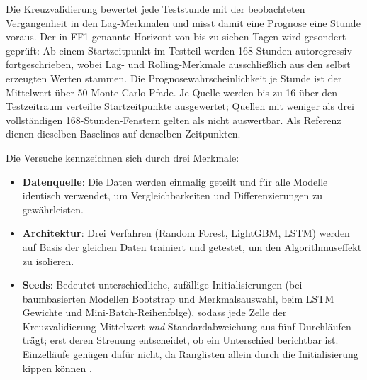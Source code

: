 Die Kreuzvalidierung bewertet jede Teststunde mit der beobachteten Vergangenheit in den Lag-Merkmalen und misst damit eine Prognose eine Stunde voraus. Der in FF1 genannte Horizont von bis zu sieben Tagen wird gesondert geprüft: Ab einem Startzeitpunkt im Testteil werden 168 Stunden autoregressiv fortgeschrieben, wobei Lag- und Rolling-Merkmale ausschließlich aus den selbst erzeugten Werten stammen. Die Prognosewahrscheinlichkeit je Stunde ist der Mittelwert über 50 Monte-Carlo-Pfade. Je Quelle werden bis zu 16 über den Testzeitraum verteilte Startzeitpunkte ausgewertet; Quellen mit weniger als drei vollständigen 168-Stunden-Fenstern gelten als nicht auswertbar. Als Referenz dienen dieselben Baselines auf denselben Zeitpunkten.

Die Versuche kennzeichnen sich durch drei Merkmale:
\begin{itemize}
  \item \textbf{Datenquelle}: Die Daten werden einmalig geteilt und für alle Modelle identisch verwendet, um Vergleichbarkeiten und Differenzierungen zu gewährleisten.
  \item \textbf{Architektur}: Drei Verfahren (Random Forest, LightGBM, LSTM) werden auf Basis der gleichen Daten trainiert und getestet, um den Algorithmuseffekt zu isolieren.
  \item \textbf{Seeds}: Bedeutet unterschiedliche, zufällige Initialisierungen (bei baumbasierten Modellen Bootstrap und Merkmalsauswahl, beim LSTM Gewichte und Mini-Batch-Reihenfolge), sodass jede Zelle der Kreuzvalidierung Mittelwert \emph{und} Standardabweichung aus fünf Durchläufen trägt; erst deren Streuung entscheidet, ob ein Unterschied berichtbar ist. Einzelläufe genügen dafür nicht, da Ranglisten allein durch die Initialisierung kippen können \parencite{bouthillier2021variance,reimers2017reporting}.
\end{itemize}

